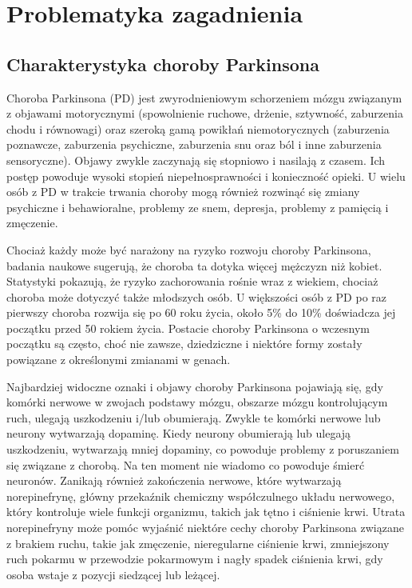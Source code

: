 \chapter{Problematyka zagadnienia}
\label{ch:problematyka}

\section{Charakterystyka choroby Parkinsona}
\label{sec:charakterystykaPD}


Choroba Parkinsona (PD) jest zwyrodnieniowym schorzeniem mózgu związanym z objawami motorycznymi (spowolnienie ruchowe,
drżenie, sztywność, zaburzenia chodu i równowagi) oraz szeroką gamą powikłań niemotorycznych (zaburzenia poznawcze,
zaburzenia psychiczne, zaburzenia snu oraz ból i inne zaburzenia sensoryczne).
Objawy zwykle zaczynają się stopniowo i nasilają z czasem.
Ich postęp powoduje wysoki stopień niepełnosprawności i konieczność opieki.
U wielu osób z PD w trakcie trwania choroby mogą również rozwinąć się zmiany psychiczne i behawioralne, problemy ze snem,
depresja, problemy z pamięcią i zmęczenie.

Chociaż każdy może być narażony na ryzyko rozwoju choroby Parkinsona, badania naukowe sugerują,
że choroba ta dotyka więcej mężczyzn niż kobiet.
Statystyki pokazują, że ryzyko zachorowania rośnie wraz z wiekiem, chociaż choroba może dotyczyć także młodszych osób.
U większości osób z PD po raz pierwszy choroba rozwija się po 60 roku życia, około 5\% do 10\% doświadcza jej początku przed 50 rokiem życia.
Postacie choroby Parkinsona o wczesnym początku są często, choć nie zawsze, dziedziczne i niektóre formy zostały powiązane z
określonymi zmianami w genach\cite{National_Institute_on_Aging_2022}.


Najbardziej widoczne oznaki i objawy choroby Parkinsona pojawiają się, gdy komórki nerwowe w zwojach podstawy mózgu,
obszarze mózgu kontrolującym ruch, ulegają uszkodzeniu i/lub obumierają.
Zwykle te komórki nerwowe lub neurony wytwarzają dopaminę.
Kiedy neurony obumierają lub ulegają uszkodzeniu, wytwarzają mniej dopaminy, co powoduje problemy z poruszaniem się
związane z chorobą.
Na ten moment nie wiadomo co powoduje śmierć neuronów.
Zanikają również zakończenia nerwowe, które wytwarzają norepinefrynę, główny przekaźnik chemiczny
współczulnego układu nerwowego, który kontroluje wiele funkcji organizmu, takich jak tętno i ciśnienie krwi.
Utrata norepinefryny może pomóc wyjaśnić niektóre cechy choroby Parkinsona związane z brakiem ruchu, takie jak zmęczenie,
nieregularne ciśnienie krwi, zmniejszony ruch pokarmu w przewodzie pokarmowym i nagły spadek ciśnienia krwi, gdy osoba wstaje z pozycji siedzącej lub leżącej.


